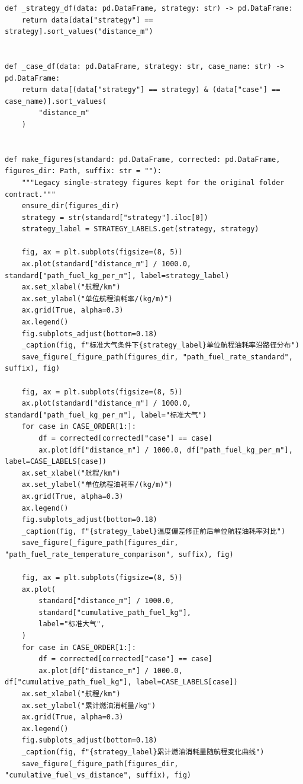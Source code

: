 \documentclass[withoutpreface,bwprint]{cumcmthesis} %
\begin{document}
\begin{center}
\begin{lstlisting}
def _strategy_df(data: pd.DataFrame, strategy: str) -> pd.DataFrame:
    return data[data["strategy"] == strategy].sort_values("distance_m")


def _case_df(data: pd.DataFrame, strategy: str, case_name: str) -> pd.DataFrame:
    return data[(data["strategy"] == strategy) & (data["case"] == case_name)].sort_values(
        "distance_m"
    )


def make_figures(standard: pd.DataFrame, corrected: pd.DataFrame, figures_dir: Path, suffix: str = ""):
    """Legacy single-strategy figures kept for the original folder contract."""
    ensure_dir(figures_dir)
    strategy = str(standard["strategy"].iloc[0])
    strategy_label = STRATEGY_LABELS.get(strategy, strategy)

    fig, ax = plt.subplots(figsize=(8, 5))
    ax.plot(standard["distance_m"] / 1000.0, standard["path_fuel_kg_per_m"], label=strategy_label)
    ax.set_xlabel("航程/km")
    ax.set_ylabel("单位航程油耗率/(kg/m)")
    ax.grid(True, alpha=0.3)
    ax.legend()
    fig.subplots_adjust(bottom=0.18)
    _caption(fig, f"标准大气条件下{strategy_label}单位航程油耗率沿路径分布")
    save_figure(_figure_path(figures_dir, "path_fuel_rate_standard", suffix), fig)

    fig, ax = plt.subplots(figsize=(8, 5))
    ax.plot(standard["distance_m"] / 1000.0, standard["path_fuel_kg_per_m"], label="标准大气")
    for case in CASE_ORDER[1:]:
        df = corrected[corrected["case"] == case]
        ax.plot(df["distance_m"] / 1000.0, df["path_fuel_kg_per_m"], label=CASE_LABELS[case])
    ax.set_xlabel("航程/km")
    ax.set_ylabel("单位航程油耗率/(kg/m)")
    ax.grid(True, alpha=0.3)
    ax.legend()
    fig.subplots_adjust(bottom=0.18)
    _caption(fig, f"{strategy_label}温度偏差修正前后单位航程油耗率对比")
    save_figure(_figure_path(figures_dir, "path_fuel_rate_temperature_comparison", suffix), fig)

    fig, ax = plt.subplots(figsize=(8, 5))
    ax.plot(
        standard["distance_m"] / 1000.0,
        standard["cumulative_path_fuel_kg"],
        label="标准大气",
    )
    for case in CASE_ORDER[1:]:
        df = corrected[corrected["case"] == case]
        ax.plot(df["distance_m"] / 1000.0, df["cumulative_path_fuel_kg"], label=CASE_LABELS[case])
    ax.set_xlabel("航程/km")
    ax.set_ylabel("累计燃油消耗量/kg")
    ax.grid(True, alpha=0.3)
    ax.legend()
    fig.subplots_adjust(bottom=0.18)
    _caption(fig, f"{strategy_label}累计燃油消耗量随航程变化曲线")
    save_figure(_figure_path(figures_dir, "cumulative_fuel_vs_distance", suffix), fig)



\end{lstlisting}
\end{center}
\end{document}
